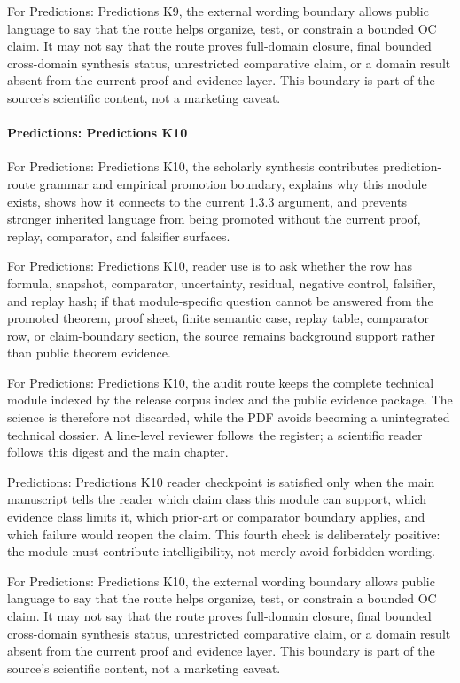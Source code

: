 For Predictions: Predictions K9, the external wording boundary allows public language to say that the route helps organize, test, or constrain a bounded OC claim. It may not say that the route proves full-domain closure, final bounded cross-domain synthesis status, unrestricted comparative claim, or a domain result absent from the current proof and evidence layer. This boundary is part of the source's scientific content, not a marketing caveat.


\paragraph{Predictions: Predictions K10}

For Predictions: Predictions K10, the scholarly synthesis contributes prediction-route grammar and empirical promotion boundary, explains why this module exists, shows how it connects to the current 1.3.3 argument, and prevents stronger inherited language from being promoted without the current proof, replay, comparator, and falsifier surfaces.


For Predictions: Predictions K10, reader use is to ask whether the row has formula, snapshot, comparator, uncertainty, residual, negative control, falsifier, and replay hash; if that module-specific question cannot be answered from the promoted theorem, proof sheet, finite semantic case, replay table, comparator row, or claim-boundary section, the source remains background support rather than public theorem evidence.


For Predictions: Predictions K10, the audit route keeps the complete technical module indexed by the release corpus index and the public evidence package. The science is therefore not discarded, while the PDF avoids becoming a unintegrated technical dossier. A line-level reviewer follows the register; a scientific reader follows this digest and the main chapter.


Predictions: Predictions K10 reader checkpoint is satisfied only when the main manuscript tells the reader which claim class this module can support, which evidence class limits it, which prior-art or comparator boundary applies, and which failure would reopen the claim. This fourth check is deliberately positive: the module must contribute intelligibility, not merely avoid forbidden wording.


For Predictions: Predictions K10, the external wording boundary allows public language to say that the route helps organize, test, or constrain a bounded OC claim. It may not say that the route proves full-domain closure, final bounded cross-domain synthesis status, unrestricted comparative claim, or a domain result absent from the current proof and evidence layer. This boundary is part of the source's scientific content, not a marketing caveat.


